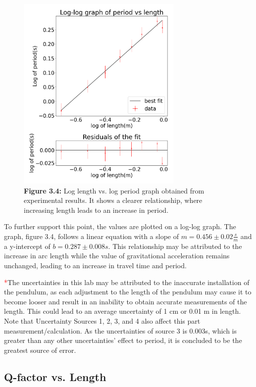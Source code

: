 \documentclass[11pt,titlepage,a4paper,twocolumn]{article}
\begin{document}
            \begin{figure}[H]
                \centering
                \includegraphics[width=8cm]{3.3.2.png}
                \caption*{\textbf{Figure 3.4:} Log length vs. log period graph obtained from experimental results. It shows a clearer relationship, where increasing length leads to an increase in period.}
            \end{figure}
    
            To further support this point, the values are plotted on a log-log graph. The graph, figure 3.4, follows a linear equation with a slope of $m = 0.456 \pm 0.02\frac{s}{m}$ and a y-intercept of $b = 0.287 \pm 0.008s$. This relationship may be attributed to the increase in arc length while the value of gravitational acceleration remains unchanged, leading to an increase in travel time and period.
            
            \textcolor{red}{*}The uncertainties in this lab may be attributed to the inaccurate installation of the pendulum, as each adjustment to the length of the pendulum may cause it to become looser and result in an inability to obtain accurate measurements of the length. This could lead to an average uncertainty of 1 cm or 0.01 m in length. Note that Uncertainty Sources 1, 2, 3, and 4 also affect this part measurement/calculation. As the uncertainties of source 3 is 0.003s, which is greater than any other uncertainties' effect to period, it is concluded to be the greatest source of error.


    \subsection{Q-factor vs. Length}
\end{document}
